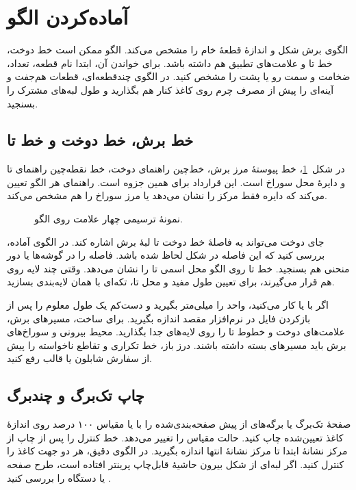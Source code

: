 \section{آماده‌کردن الگو}

الگوی برش شکل و اندازۀ قطعۀ خام را مشخص می‌کند. الگو ممکن است خط دوخت، خط تا و علامت‌های تطبیق هم داشته باشد. برای خواندن آن، ابتدا نام قطعه، تعداد، ضخامت و سمت رو یا پشت را مشخص کنید. در الگوی چندقطعه‌ای، قطعات هم‌جفت و آینه‌ای را پیش از مصرف چرم روی کاغذ کنار هم بگذارید و طول لبه‌های مشترک را بسنجید.

\subsection{خط برش، خط دوخت و خط تا}

در شکل~\ref{fig:lines}، خط پیوستۀ  مرز برش، خط‌چین  راهنمای دوخت، خط نقطه‌چین  راهنمای تا و دایرۀ  محل سوراخ است. این قرارداد برای همین جزوه است. راهنمای هر الگو تعیین می‌کند که دایره فقط مرکز را نشان می‌دهد یا مرز سوراخ را هم مشخص می‌کند.

\begin{figure}[!htbp]
  \centering
  \PatternLinesDiagram
  \caption{نمونۀ ترسیمی چهار علامت روی الگو.}
  \label{fig:lines}
\end{figure}

جای دوخت می‌تواند به فاصلۀ خط دوخت تا لبۀ برش اشاره کند. در الگوی آماده، بررسی کنید که این فاصله در شکل لحاظ شده باشد. فاصله را در گوشه‌ها یا دور منحنی هم بسنجید. خط تا روی الگو محل اسمی تا را نشان می‌دهد. وقتی چند لایه روی هم قرار می‌گیرند، برای تعیین طول مفید و محل تا، تکه‌ای با همان لایه‌بندی بسازید.

اگر با  یا  کار می‌کنید، واحد را میلی‌متر بگیرید و دست‌کم یک طول معلوم را پس از بازکردن فایل در نرم‌افزار مقصد اندازه بگیرید. برای ساخت، مسیرهای برش، علامت‌های دوخت و خطوط تا را روی لایه‌های جدا بگذارید. محیط بیرونی و سوراخ‌های برش باید مسیرهای بسته داشته باشند. درز باز، خط تکراری و تقاطع ناخواسته را پیش از سفارش شابلون یا قالب رفع کنید.

\subsection{چاپ تک‌برگ و چندبرگ}

صفحۀ تک‌برگ یا برگه‌های از پیش صفحه‌بندی‌شده را با  یا مقیاس ۱۰۰ درصد روی اندازۀ کاغذ تعیین‌شده چاپ کنید. حالت  مقیاس را تغییر می‌دهد. خط کنترل را پس از چاپ از مرکز نشانۀ ابتدا تا مرکز نشانۀ انتها اندازه بگیرید. در الگوی دقیق، هر دو جهت کاغذ را کنترل کنید. اگر لبه‌ای از شکل بیرون حاشیۀ قابل‌چاپ پرینتر افتاده است، طرح صفحه یا دستگاه را بررسی کنید \cite{adobe-size}.

